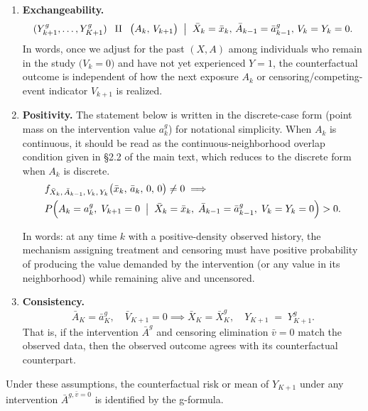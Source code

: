 \begin{tcolorbox}[title= Identification Conditions, breakable, enhanced jigsaw]

\begin{enumerate}
    \item \textbf{Exchangeability.}  
      \[
         (Y_{k+1}^g,\ldots,Y_{K+1}^g)
         \;\;\amalg\;\; \bigl(A_k, \,V_{k+1}\bigr)
         \;\bigm|\; \bar{X}_k = \bar{x}_k, \,\bar{A}_{k-1} = \bar{a}^g_{k-1},\,V_k=Y_k=0.
      \]
      In words, once we adjust for the past \((X,A)\) among individuals who remain in the study \(\bigl(V_k =0\bigr)\) and have not yet experienced \(Y=1\), the counterfactual outcome is independent of how the next exposure \(A_k\) or censoring/competing-event indicator \(V_{k+1}\) is realized.

    \item \textbf{Positivity.}
      The statement below is written in the discrete-case form (point mass on the intervention
      value \(a_k^g\)) for notational simplicity. When \(A_k\) is continuous, it should be read
      as the continuous-neighborhood overlap condition given in \S 2.2 of the main text, which
      reduces to the discrete form when \(A_k\) is discrete.
      \begin{align*}
              & f_{\bar{X}_k,\,\bar{A}_{k-1},\,V_k,\,Y_k}\bigl(\bar{x}_k,\,\bar{a}_k,\,0,\,0\bigr)\neq 0  \implies  \\
              & P\Bigl(A_k = a^g_k,\; V_{k+1}=0 \;\bigm|\; \bar{X}_k=\bar{x}_k,\; \bar{A}_{k-1}=\bar{a}^g_{k-1},\; V_k = Y_k = 0\Bigr) > 0.
      \end{align*}

      In words: at any time \(k\) with a positive-density observed history, the mechanism
      assigning treatment and censoring must have positive probability of producing the value
      demanded by the intervention (or any value in its neighborhood) while remaining alive
      and uncensored.

    \item \textbf{Consistency.}   
      \[\bar{A}_K = \bar{a}^g_K, \quad \bar{V}_{K+1}=0 \implies   \bar{X}_K =\bar{X}_K^g, \quad Y_{K+1} \;=\;Y_{K+1}^g.\] 
      That is, if the intervention \(\bar{A}^g\) and censoring elimination \(\bar{v}=0\) match the observed data, then the observed outcome agrees with its counterfactual counterpart.
\end{enumerate}
\end{tcolorbox}

Under these assumptions, the counterfactual risk or mean of \(Y_{K+1}\) 
under any intervention \(\bar{A}^{g,\bar{v}=0}\) is identified by the g-formula.



